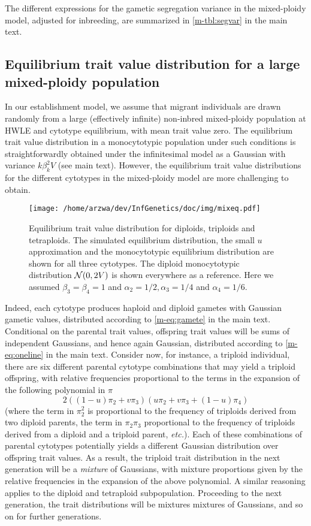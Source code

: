 \documentclass[11pt,a4paper]{article}
\begin{document}
The different expressions for the gametic segregation variance in the
mixed-ploidy model, adjusted for inbreeding, are summarized in
\cref{m-tbl:segvar} in the main text.


\subsection{Equilibrium trait value distribution for a large mixed-ploidy
population \label{sec:mixeq}}

In our establishment model, we assume that migrant individuals are drawn
randomly from a large (effectively infinite) non-inbred mixed-ploidy population
at HWLE and cytotype equilibrium, with mean trait value zero.
The equilibrium trait value distribution in a monocytotypic population
under such conditions is straightforwardly obtained under the infinitesimal
model as a Gaussian with variance $k \beta_k^2 V$ (see main text).
However, the equilibrium trait value distributions for the different cytotypes
in the mixed-ploidy model are more challenging to obtain.

\begin{figure}
\centering
\texttt{[image: /home/arzwa/dev/InfGenetics/doc/img/mixeq.pdf]}
\caption{
    Equilibrium trait value distribution for diploids, triploids and
    tetraploids.
    The simulated equilibrium distribution, the small $u$ approximation and the
    monocytotypic equilibrium distribution are shown for all three cytotypes.
    The diploid monocytotypic distribution $\mathcal{N}(0,2V)$ is shown everywhere
    as a reference. Here we assumed $\beta_3 = \beta_4 = 1$ and $\alpha_2 =
    1/2, \alpha_3 = 1/4$ and $\alpha_4 = 1/6$.
\label{fig:mixeq}}
\end{figure}

Indeed, each cytotype produces haploid and diploid gametes with Gaussian
gametic values, distributed according to \cref{m-eq:gamete} in the main text.
Conditional on the parental trait values, offspring trait values will be sums
of independent Gaussians, and hence again Gaussian, distributed according to
\cref{m-eq:oneline} in the main text.
Consider now, for instance, a triploid individual, there are six different
parental cytotype combinations that may yield a triploid offspring, with
relative frequencies proportional to the terms in the expansion of the
following polynomial in $\pi$
  $$2((1-u)\pi_2 + v\pi_3)(u\pi_2 + v\pi_3 + (1-u)\pi_4)$$
(where the term in $\pi_2^2$ is proportional to the frequency of triploids
derived from two diploid parents, the term in $\pi_2\pi_3$ proportional to the
frequency of triploids derived from a diploid and a triploid parent,
\textit{etc.}).
Each of these combinations of parental cytotypes potentially yields a different
Gaussian distribution over offspring trait values.
As a result, the triploid trait distribution in the next generation will be a
\textit{mixture} of Gaussians, with mixture proportions given by the relative
frequencies in the expansion of the above polynomial.
A similar reasoning applies to the diploid and tetraploid subpopulation.
Proceeding to the next generation, the trait distributions will be mixtures
mixtures of Gaussians, and so on for further generations.
\end{document}
